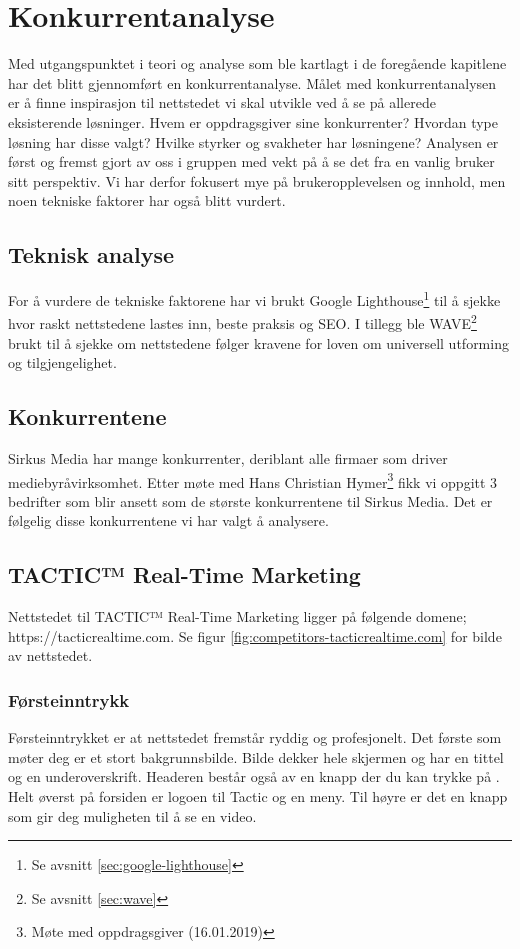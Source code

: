 \section{Konkurrentanalyse}
\label{sec:competitor-analysis}

Med utgangspunktet i teori og analyse som ble kartlagt i de foregående kapitlene har det blitt gjennomført en konkurrentanalyse. Målet med konkurrentanalysen er å finne inspirasjon til nettstedet vi skal utvikle ved å se på allerede eksisterende løsninger. Hvem er oppdragsgiver sine konkurrenter? Hvordan type løsning har disse valgt? Hvilke styrker og svakheter har løsningene? Analysen er først og fremst gjort av oss i gruppen med vekt på å se det fra en vanlig bruker sitt perspektiv. Vi har derfor fokusert mye på brukeropplevelsen og innhold, men noen tekniske faktorer har også blitt vurdert.

\subsection{Teknisk analyse}
For å vurdere de tekniske faktorene har vi brukt Google Lighthouse\footnote{Se avsnitt \ref{sec:google-lighthouse}} til å sjekke hvor raskt nettstedene lastes inn, beste praksis og SEO. I tillegg ble WAVE\footnote{Se avsnitt \ref{sec:wave}} brukt til å sjekke om nettstedene følger kravene for loven om universell utforming og tilgjengelighet.

\subsection{Konkurrentene}
Sirkus Media har mange konkurrenter, deriblant alle firmaer som driver mediebyråvirksomhet. Etter møte med Hans Christian Hymer\footnote{Møte med oppdragsgiver (16.01.2019)} fikk vi oppgitt 3 bedrifter som blir ansett som de største konkurrentene til Sirkus Media. Det er følgelig disse konkurrentene vi har valgt å analysere.

\subsection{TACTIC™ Real-Time Marketing}
Nettstedet til TACTIC™ Real-Time Marketing ligger på følgende domene; https://tacticrealtime.com. Se figur \ref{fig:competitors-tacticrealtime.com} for bilde av nettstedet.

\subsubsection{Førsteinntrykk}
Førsteinntrykket er at nettstedet fremstår ryddig og profesjonelt. Det første som møter deg er et stort bakgrunnsbilde. Bilde dekker hele skjermen og har en tittel og en underoverskrift. Headeren består også av en knapp der du kan trykke på . Helt øverst på forsiden er logoen til Tactic og en meny. Til høyre er det en knapp som gir deg muligheten til å se en video. 

